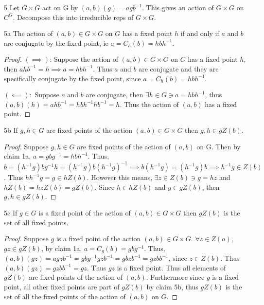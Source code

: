 \documentclass{article}
\begin{document}
\begin{PROB}{5}\label{Problem 5.}
    Let $G \times G$ act on G by $(a,b)(g) = a g b^{-1}$.  This gives an action of $G \times G$ on $C^G$. Decompose this into irreducible reps of $G \times G$.   
\end{PROB}
\begin{claim}{5a}\label{Claim 5a.}
    The action of $(a, b) \in G \times G$ on $G$ has a fixed point $h$ if and only if $a$ and $b$ are conjugate by the fixed point, ie $a = C_h(b) = hbh^{-1}$.   
\end{claim}
\begin{proof}
    $(\implies)$: Suppose the action of $(a, b) \in G \times G$ on $G$ has a fixed point $h$, then $ahb^{-1} = h \implies a = hbh^{-1}$. Thus $a$ and $b$ are conjugate and they are specifically conjugate by the fixed point, since $a = C_h(b) = hbh^{-1}$. 
    
    $(\impliedby):$ Suppose $a$ and $b$ are conjugate, then $\exists h \in G \ni a = hbh^{-1}$, thus $(a, b)(h) = ahb^{-1} = hbh^{-1}hb^{-1} = h$. Thus the action of $(a, b)$ has a fixed point.    
\end{proof}
\begin{claim}{5b}\label{Claim 5b.}
    If $g, h \in G$ are fixed points of the action $(a, b) \in G \times G$ then $g, h \in gZ(b)$.   
\end{claim}
\begin{proof}
    Suppose $g, h \in G$ are fixed points of the action of $(a, b)$ on G. Then by claim 1a, $a = gbg^{-1} = hbh^{-1}$. Thus, $b = (h^{-1}g)bg^{-1}h = (h^{-1}g)b(h^{-1}g)^{-1} \implies b(h^{-1}g) = (h^{-1}g)b \implies h^{-1}g \in Z(b)$. Thus $h h^{-1} g = g \in hZ(b)$. However this means, $\exists z \in Z(b) \ni g = hz$ and $hZ(b) = hzZ(b) = gZ(b)$. Since $h \in hZ(b)$ and $g \in gZ(b)$, then $g, h \in gZ(b)$.            
\end{proof}
\begin{claim}{5c}\label{Claim 5c.}
    If $g \in G$ is a fixed point of the action of $(a, b) \in G \times G$ then $gZ(b)$ is the set of all fixed points.  
\end{claim}
\begin{proof}
Suppose $g$ is a fixed point of the action $(a, b) \in G \times G$. $\forall z \in Z(a)$, $gz \in gZ(b)$, by claim 1a, $a = C_g(b) = gbg^{-1}$. Thus, $(a, b)(gz) = agzb^{-1} = gbg^{-1}gzb^{-1} = gbzb^{-1} = gzbb^{-1}$, since $z \in Z(b)$. Thus $(a, b)(gz) = gzbb^{-1} = gz$. Thus $gz$ is a fixed point. Thus all elements of $gZ(b)$ are fixed points of the action of $(a, b)$. Furthermore since $g$ is a fixed point, all other fixed points are part of $gZ(b)$ by claim 5b, thus $gZ(b)$ is the set of all the fixed points of the action of $(a, b)$ on $G$.      
\end{proof}
\end{document}
